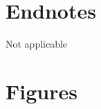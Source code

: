 \documentclass{bmcart}
\begin{document}
\begin{backmatter}
\section*{Endnotes}  
Not applicable  

%




\section*{Figures}



\end{backmatter}
\end{document}
